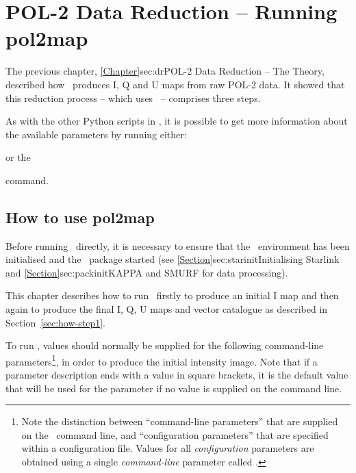 \chapter{POL-2 Data Reduction -- Running
  pol2map}
\label{sec:rundr}

The previous chapter, \cref{Chapter}{sec:dr}{POL-2 Data Reduction --
  The Theory}, described how \poltwomap\ produces I, Q and U maps from raw
POL-2 data.  It showed that this reduction process -- which uses
\poltwomap\ -- comprises three steps.

As with the other Python scripts in \SMURF, it is possible to get more
information about the available parameters by running either:
\begin{terminalv}
\end{terminalv}
or the
\begin{terminalv}
\end{terminalv}
command.

\section{How to use pol2map}

Before running \poltwomap\ directly, it is necessary to ensure that
the \starlink\ environment has been initialised and the \smurf\
package started (see \cref{Section}{sec:starinit}{Initialising
  Starlink} and \cref{Section}{sec:packinit}{KAPPA and SMURF for data
  processing}).

This chapter describes how to run \poltwomap\ firstly to produce an
initial I map and then again to produce the final I, Q, U maps and
vector catalogue as described in Section~\ref{sec:how-step1}.

To run \poltwomap, values should normally be supplied for the following
command-line parameters\footnote{Note the distinction between
  ``command-line parameters'' that are supplied on the
  \poltwomap\ command line, and ``configuration parameters'' that
  are specified within a configuration file. Values for all
  \emph{configuration} parameters are obtained using a single
  \emph{command-line} parameter called .}, in order to
  produce the initial intensity image. Note that if a parameter description ends
  with a value in square brackets, it is the default value that will be used for
the parameter if no value is supplied on the command line.

